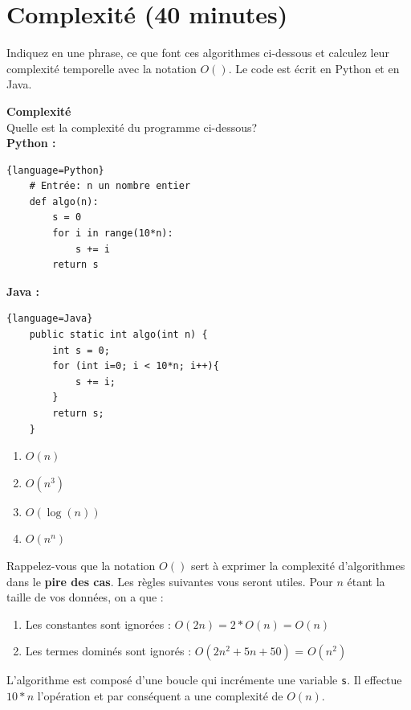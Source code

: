 \section{Complexité (40 minutes)}

Indiquez en une phrase, ce que font ces algorithmes ci-dessous et calculez leur complexité temporelle avec la notation $O( )$. Le code est écrit en Python et en Java. \\

\begin{Exercice}[10 minutes] \textbf{Complexité} \\

    Quelle est la complexité du programme ci-dessous?\\
    \textbf{Python :}
    \begin{lstlisting}{language=Python}
    # Entrée: n un nombre entier
    def algo(n):
        s = 0
        for i in range(10*n):
            s += i
        return s \end{lstlisting}
    
    \textbf{Java :}
    \begin{lstlisting}{language=Java}
    public static int algo(int n) {
        int s = 0;
        for (int i=0; i < 10*n; i++){
            s += i;
        }
        return s;
    }  \end{lstlisting}

    \begin{enumerate}
        \item $O(n)$
        \item $O(n^3)$
        \item $O(\log(n))$
        \item $O(n^n)$
    \end{enumerate}
    
    \begin{conseil}
    Rappelez-vous que la notation $O()$ sert à exprimer la complexité d'algorithmes dans le \textbf{pire des cas}. Les règles suivantes vous seront utiles. Pour $n$ étant la taille de vos données, on a que :
    \begin{enumerate}
        \item Les constantes sont ignorées : $O(2n) = 2*O(n) = O(n)$ 
        \item Les termes dominés sont ignorés : $O(2n^2+5n+50)$ = $O(n^2)$
    \end{enumerate}
    \end{conseil}

    \begin{solution}
        L'algorithme est composé d'une boucle qui incrémente une variable \lstinline{s}. Il effectue $10*n$ l'opération et par conséquent a une complexité de $O(n)$.
    \end{solution}
\end{Exercice}


